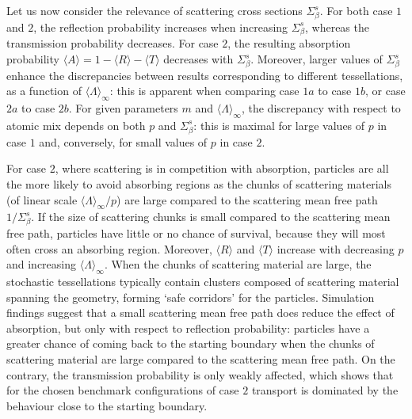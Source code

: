 \documentclass[final,authoryear,5p,times,twocolumn]{elsarticle}
\begin{document}
Let us now consider the relevance of scattering cross sections $\Sigma_{\beta}^s$. For both case $1$ and $2$, the reflection probability increases when increasing $\Sigma_{\beta}^s$, whereas the transmission probability decreases. For case $2$, the resulting absorption probability $\langle A \rangle=1-\langle R \rangle -\langle T \rangle$ decreases with $\Sigma_{\beta}^s$. Moreover, larger values of $\Sigma_{\beta}^s$ enhance the discrepancies between results corresponding to different tessellations, as a function of ${\langle \Lambda \rangle}_{\infty}$: this is apparent when comparing case $1a$ to case $1b$, or case $2a$ to case $2b$. For given parameters $m$ and ${\langle \Lambda \rangle}_{\infty}$, the discrepancy with respect to atomic mix depends on both $p$ and $\Sigma_{\beta}^s$: this is maximal for large values of $p$ in case $1$ and, conversely, for small values of $p$ in case $2$.

For case $2$, where scattering is in competition with absorption, particles are all the more likely to avoid absorbing regions as the chunks of scattering materials (of linear scale ${\langle \Lambda \rangle}_{\infty}/p$) are large compared to the scattering mean free path $1/\Sigma_{\beta}^s$. If the size of scattering chunks is small compared to the scattering mean free path, particles have little or no chance of survival, because they will most often cross an absorbing region. Moreover, $\langle R\rangle$ and $\langle T\rangle$ increase with decreasing $p$ and increasing ${\langle \Lambda \rangle}_{\infty}$. When the chunks of scattering material are large, the stochastic tessellations typically contain clusters composed of scattering material spanning the geometry, forming `safe corridors' for the particles. Simulation findings suggest that a small scattering mean free path does reduce the effect of absorption, but only with respect to reflection probability: particles have a greater chance of coming back to the starting boundary when the chunks of scattering material are large compared to the scattering mean free path. On the contrary, the transmission probability is only weakly affected, which shows that for the chosen benchmark configurations of case $2$ transport is dominated by the behaviour close to the starting boundary.
\end{document}
